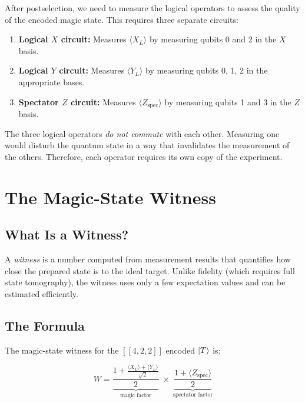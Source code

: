 \documentclass[11pt,a4paper,twoside]{report}
\theoremstyle{definition}
\newcommand{\expect}[1]{\langle #1 \rangle}
\newcommand{\ketT}{\ket{T}}
\begin{document}
After postselection, we need to measure the logical operators to assess
the quality of the encoded magic state. This requires three separate
circuits:

\begin{enumerate}
  \item \textbf{Logical $X$ circuit:} Measures $\expect{X_L}$ by
        measuring qubits 0 and 2 in the $X$ basis.
  \item \textbf{Logical $Y$ circuit:} Measures $\expect{Y_L}$ by
        measuring qubits 0, 1, 2 in the appropriate bases.
  \item \textbf{Spectator $Z$ circuit:} Measures $\expect{Z_{\text{spec}}}$
        by measuring qubits 1 and 3 in the $Z$ basis.
\end{enumerate}

\begin{warning}[title={Why Three Separate Circuits?}]
The three logical operators \emph{do not commute} with each other.
Measuring one would disturb the quantum state in a way that invalidates
the measurement of the others. Therefore, each operator requires its own
copy of the experiment.
\end{warning}

\chapter{The Magic-State Witness}
\label{ch:witness}

\section{What Is a Witness?}

A \emph{witness} is a number computed from measurement results that
quantifies how close the prepared state is to the ideal target.
Unlike fidelity (which requires full state tomography), the witness
uses only a few expectation values and can be estimated efficiently.

\section{The Formula}
\label{sec:witness-formula}

The magic-state witness for the $[\![4,2,2]\!]$ encoded $\ketT$ is:

\begin{equation}
  \boxed{
  W = \underbrace{\frac{1 + \frac{\expect{X_L} + \expect{Y_L}}{\sqrt{2}}}{2}}_{\text{magic factor}}
  \;\times\;
  \underbrace{\frac{1 + \expect{Z_{\text{spec}}}}{2}}_{\text{spectator factor}}
  }
  \label{eq:witness}
\end{equation}
\end{document}
